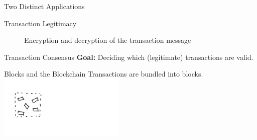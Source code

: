 \documentclass[handout]{beamer}
\begin{document}
\begin{frame}{Two Distinct Applications}
	
\end{frame}


\begin{frame}{Transaction Legitimacy}
	\begin{figure}[h!]
		\center
		
		\caption*{Encryption and decryption of the transaction message}
		\label{fig:asymmeinfach}
	\end{figure}
\end{frame}

\begin{frame}{Transaction Consensus}
\textbf{Goal: }Deciding which (legitimate) transactions are valid. \\
\vspace{1em}
\end{frame}

\begin{frame}{Blocks and the Blockchain}
Transactions are bundled into blocks. \\
\includegraphics[width=6cm]{../assets/images/block_1.png} \\
\end{frame}
\end{document}
